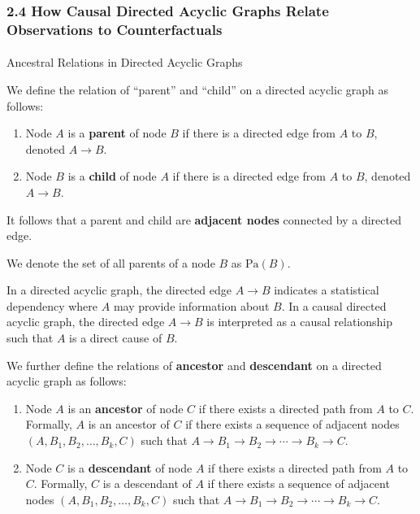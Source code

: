 \documentclass[
  single column]{article}
\makeatletter
\let\oldparagraph\paragraph
\renewcommand{\paragraph}{
    \@ifstar
      \xxxParagraphStar
      \xxxParagraphNoStar
  }
\newcommand{\xxxParagraphStar}[1]{\oldparagraph*{#1}\mbox{}}
\newcommand{\xxxParagraphNoStar}[1]{\oldparagraph{#1}\mbox{}}
\providecommand{\tightlist}{%
  \setlength{\itemsep}{0pt}\setlength{\parskip}{0pt}}\usepackage{longtable,booktabs,array}
\makeatother
\begin{document}
\subsubsection{2.4 How Causal Directed Acyclic Graphs Relate
Observations to
Counterfactuals}\label{how-causal-directed-acyclic-graphs-relate-observations-to-counterfactuals}

\paragraph{Ancestral Relations in Directed Acyclic
Graphs}\label{ancestral-relations-in-directed-acyclic-graphs}

We define the relation of ``parent'' and ``child'' on a directed acyclic
graph as follows:

\begin{enumerate}
\def\labelenumi{\arabic{enumi}.}
\tightlist
\item
  Node \(A\) is a \textbf{parent} of node \(B\) if there is a directed
  edge from \(A\) to \(B\), denoted \(A \rightarrow B\).
\item
  Node \(B\) is a \textbf{child} of node \(A\) if there is a directed
  edge from \(A\) to \(B\), denoted \(A \rightarrow B\).
\end{enumerate}

It follows that a parent and child are \textbf{adjacent nodes} connected
by a directed edge.

We denote the set of all parents of a node \(B\) as \(\text{Pa}(B)\).

In a directed acyclic graph, the directed edge \(A \rightarrow B\)
indicates a statistical dependency where \(A\) may provide information
about \(B\). In a causal directed acyclic graph, the directed edge
\(A \rightarrow B\) is interpreted as a causal relationship such that
\(A\) is a direct cause of \(B\).

We further define the relations of \textbf{ancestor} and
\textbf{descendant} on a directed acyclic graph as follows:

\begin{enumerate}
\def\labelenumi{\arabic{enumi}.}
\tightlist
\item
  Node \(A\) is an \textbf{ancestor} of node \(C\) if there exists a
  directed path from \(A\) to \(C\). Formally, \(A\) is an ancestor of
  \(C\) if there exists a sequence of adjacent nodes
  \((A, B_1, B_2, \ldots, B_k, C)\) such that
  \(A \rightarrow B_1 \rightarrow B_2 \rightarrow \cdots \rightarrow B_k \rightarrow C\).
\item
  Node \(C\) is a \textbf{descendant} of node \(A\) if there exists a
  directed path from \(A\) to \(C\). Formally, \(C\) is a descendant of
  \(A\) if there exists a sequence of adjacent nodes
  \((A, B_1, B_2, \ldots, B_k, C)\) such that
  \(A \rightarrow B_1 \rightarrow B_2 \rightarrow \cdots \rightarrow B_k \rightarrow C\).
\end{enumerate}
\end{document}
